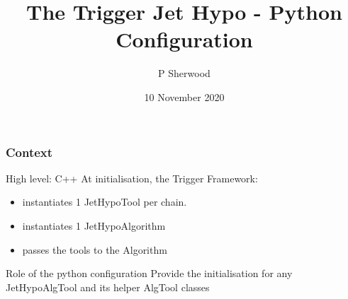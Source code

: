 \documentclass{beamer}
\title{The Trigger Jet Hypo - Python Configuration}
\author{P Sherwood}
\date{10 November 2020}
\begin{document}
\frame{\titlepage}




%	

\frame 
 {
 \frametitle{Context}
 
 \begin{block}{High level: C++}
 At initialisation, the Trigger Framework:
 \begin{itemize}
\item instantiates 1 JetHypoTool per chain.
\item instantiates 1 JetHypoAlgorithm
\item passes the tools to the Algorithm
\end{itemize}
\end{block}

\begin{block}{Role of the python configuration}
Provide the initialisation for any JetHypoAlgTool and its helper AlgTool classes
\end{block}
}
\end{document}
